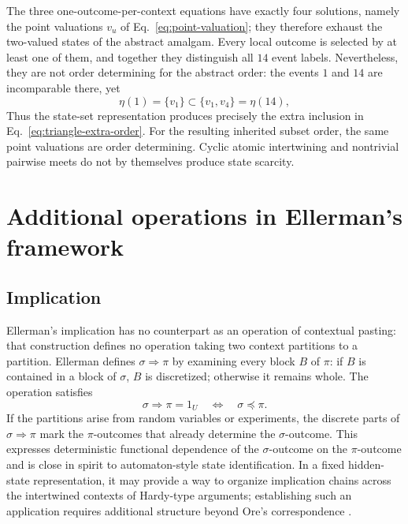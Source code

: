 \documentclass[aps,pra,reprint,nofootinbib]{revtex4-2}
\begin{document}
The three one-outcome-per-context equations have exactly four solutions,
namely the point valuations $v_u$ of Eq.~\eqref{eq:point-valuation}; they
therefore exhaust the two-valued states of the abstract amalgam.  Every local
outcome is selected by at least one of them, and together they distinguish all
$14$ event labels.  Nevertheless, they are not order determining for the
abstract order: the events $1$ and $14$ are incomparable there, yet
\begin{equation}
  \eta(1)=\{v_1\}\subset\{v_1,v_4\}=\eta(14),
  \label{eq:triangle-state-order-failure}
\end{equation}
Thus the state-set representation produces precisely the extra inclusion in
Eq.~\eqref{eq:triangle-extra-order}.  For the resulting inherited subset order,
the same point valuations are order determining.  Cyclic atomic intertwining
and nontrivial pairwise meets do not by themselves produce state scarcity.

\section{Additional operations in Ellerman's framework}

\subsection{Implication}

Ellerman's implication has no counterpart as an operation of contextual
pasting: that construction defines no operation taking two context partitions
to a partition.  Ellerman defines
$\sigma\Rightarrow\pi$ by examining every block $B$ of $\pi$: if $B$ is
contained in a block of $\sigma$, $B$ is discretized; otherwise it remains
whole.  The operation satisfies
\begin{equation}
  \sigma\Rightarrow\pi=1_U
  \quad\Longleftrightarrow\quad
  \sigma\preceq\pi.
  \label{eq:partition-implication}
\end{equation}
If the partitions arise from random variables or experiments, the discrete
parts of $\sigma\Rightarrow\pi$ mark the $\pi$-outcomes that already determine
the $\sigma$-outcome.  This expresses deterministic functional dependence of
the $\sigma$-outcome on the $\pi$-outcome and is close in spirit to automaton-style
state identification.  In a fixed hidden-state
representation, it may provide a way to organize implication chains across
the intertwined contexts of Hardy-type arguments; establishing such an
application requires additional structure beyond Ore's correspondence
\cite{svozil-2020-hardy}.
\end{document}
